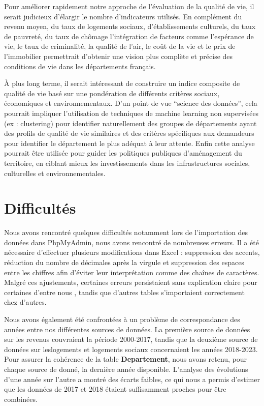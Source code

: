 \documentclass[mstat,12pt]{unswthesis}
\begin{document}
Pour améliorer rapidement notre approche de l'évaluation de la qualité
de vie, il serait judicieux d'élargir le nombre d'indicateurs utilisés.
En complément du revenu moyen, du taux de logements sociaux,
d'établissements culturels, du taux de pauvreté, du taux de chômage
l'intégration de facteurs comme l'espérance de vie, le taux de
criminalité, la qualité de l'air, le coût de la vie et le prix de
l'immobilier permettrait d'obtenir une vision plus complète et précise
des conditions de vie dans les départements français.

\bigskip

À plus long terme, il serait intéressant de construire un indice
composite de qualité de vie basé sur une pondération de différents
critères sociaux, économiques et environnementaux. D'un point de vue
``science des données'', cela pourrait impliquer l'utilisation de
techniques de machine learning non supervisées (ex : clustering) pour
identifier naturellement des groupes de départements ayant des profils
de qualité de vie similaires et des critères spécifiques aux demandeurs
pour identifier le département le plus adéquat à leur attente. Enfin
cette analyse pourrait être utilisée pour guider les politiques
publiques d'aménagement du territoire, en ciblant mieux les
investissements dans les infrastructures sociales, culturelles et
environnementales.

\section{Difficultés}\label{difficultuxe9s}

Nous avons rencontré quelques difficultés notamment lors de
l'importation des données dans PhpMyAdmin, nous avons rencontré de
nombreuses erreurs. Il a été nécessaire d'effectuer plusieurs
modifications dans Excel : suppression des accents, réduction du nombre
de décimales après la virgule et suppression des espaces entre les
chiffres afin d'éviter leur interprétation comme des chaînes de
caractères. Malgré ces ajustements, certaines erreurs persistaient sans
explication claire pour certaines d'entre nous , tandis que d'autres
tables s'importaient correctement chez d'autres.

\medskip

Nous avons également été confrontées à un problème de correspondance des
années entre nos différentes sources de données. La première source de
données sur les revenus couvraient la période 2000-2017, tandis que la
deuxième source de données sur leslogements et logements sociaux
concernaient les années 2018-2023. Pour assurer la cohérence de la table
\textbf{Departement}, nous avons retenu, pour chaque source de donné, la
dernière année disponible. L'analyse des évolutions d'une année sur
l'autre a montré des écarts faibles, ce qui nous a permis d'estimer que
les données de 2017 et 2018 étaient suffisamment proches pour être
combinées.
\end{document}
